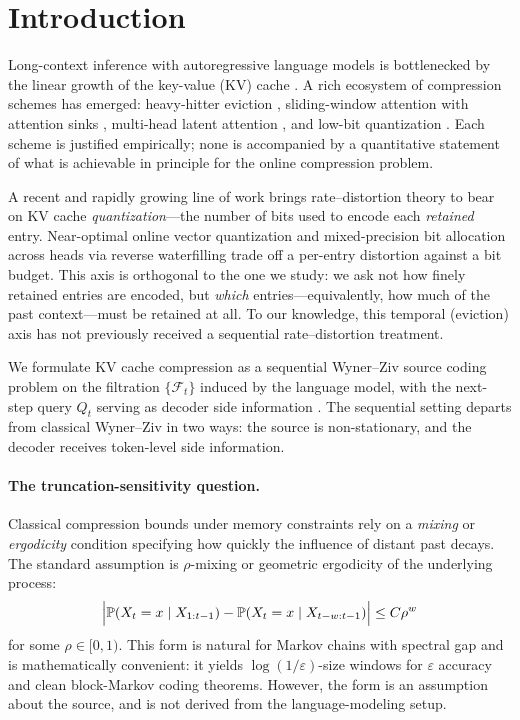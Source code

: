 \documentclass[11pt]{article}
\newcommand{\Prob}{\mathbb{P}}
\newcommand{\F}{\mathcal{F}}
\theoremstyle{plain}
\theoremstyle{definition}
\theoremstyle{remark}
\begin{document}
\section{Introduction}
\label{sec:intro}

Long-context inference with autoregressive language models is
bottlenecked by the linear growth of the key-value (KV) cache
\citep{vaswani2017attention,shazeer2019fast,ainslie2023gqa}. A rich
ecosystem of compression schemes has emerged: heavy-hitter eviction
\citep{zhang2023h2o,liu2023scissorhands}, sliding-window attention
with attention sinks \citep{xiao2024efficient,jiang2023mistral7b},
multi-head latent attention \citep{deepseek2024mla}, and low-bit
quantization \citep{liu2024kivi,kang2024gear}. Each scheme is
justified empirically; none is accompanied by a quantitative
statement of what is achievable in principle for the online
compression problem.

A recent and rapidly growing line of work brings rate--distortion
theory to bear on KV cache \emph{quantization}---the number of bits
used to encode each \emph{retained} entry. Near-optimal online vector
quantization \citep{zandieh2025turboquant} and mixed-precision
bit allocation across heads via reverse waterfilling
\citep{zuo2026ratequant} trade off a per-entry distortion against a
bit budget. This axis is orthogonal to the one we study: we ask not
how finely retained entries are encoded, but \emph{which}
entries---equivalently, how much of the past context---must be
retained at all. To our knowledge, this temporal (eviction) axis has
not previously received a sequential rate--distortion treatment.

We formulate KV cache compression as a sequential Wyner--Ziv source
coding problem on the filtration $\{\F_t\}$ induced by the language
model, with the next-step query $Q_t$ serving as decoder side
information \citep{wyner1976rate,witsenhausen1980indirect}. The
sequential setting departs from classical Wyner--Ziv in two ways:
the source is non-stationary, and the decoder receives token-level
side information.

\paragraph{The truncation-sensitivity question.}
Classical compression bounds under memory constraints rely on a
\emph{mixing} or \emph{ergodicity} condition specifying how quickly
the influence of distant past decays. The standard assumption is
$\rho$-mixing or geometric ergodicity of the underlying process:
\[
\Bigl|\Prob(X_t = x \mid X_{1:t-1}) - \Prob(X_t = x \mid X_{t-w:t-1})\Bigr|
\leq C\rho^w
\]
for some $\rho \in [0, 1)$. This form is natural for Markov chains
with spectral gap and is mathematically convenient: it yields
$\log(1/\varepsilon)$-size windows for $\varepsilon$ accuracy and
clean block-Markov coding theorems. However, the form is an
assumption about the source, and is not derived from the
language-modeling setup.
\end{document}
